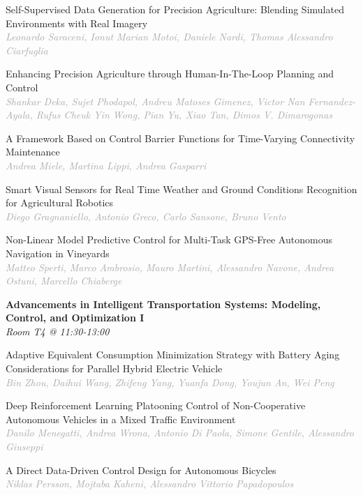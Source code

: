 \begin{multicols*}{2}
\small Self-Supervised Data Generation for Precision Agriculture: Blending Simulated Environments with Real Imagery\\ 
\footnotesize \textcolor{darkgray}{\textit{Leonardo Saraceni, Ionut Marian  Motoi, Daniele  Nardi, Thomas Alessandro  Ciarfuglia}}

\small Enhancing Precision Agriculture through Human-In-The-Loop Planning and Control\\ 
\footnotesize \textcolor{darkgray}{\textit{Shankar Deka, Sujet  Phodapol, Andreu  Matoses Gimenez, Victor  Nan Fernandez-Ayala, Rufus Cheuk Yin  Wong, Pian  Yu, Xiao  Tan, Dimos V.  Dimarogonas}}

\small A Framework Based on Control Barrier Functions for Time-Varying Connectivity Maintenance\\ 
\footnotesize \textcolor{darkgray}{\textit{Andrea Miele, Martina  Lippi, Andrea  Gasparri}}

\small Smart Visual Sensors for Real Time Weather and Ground Conditions Recognition for Agricultural Robotics\\ 
\footnotesize \textcolor{darkgray}{\textit{Diego Gragnaniello, Antonio  Greco, Carlo  Sansone, Bruno  Vento}}

\small Non-Linear Model Predictive Control for Multi-Task GPS-Free Autonomous Navigation in Vineyards\\ 
\footnotesize \textcolor{darkgray}{\textit{Matteo Sperti, Marco  Ambrosio, Mauro  Martini, Alessandro  Navone, Andrea  Ostuni, Marcello  Chiaberge}}

\normalsize \textbf{Advancements in Intelligent Transportation Systems: Modeling, Control, and Optimization I}\\
\small \textit{Room T4 @ 11:30-13:00}

\small Adaptive Equivalent Consumption Minimization Strategy with Battery Aging Considerations for Parallel Hybrid Electric Vehicle\\ 
\footnotesize \textcolor{darkgray}{\textit{Bin Zhou, Daihui  Wang, Zhifeng  Yang, Yuanfa  Dong, Youjun  An, Wei  Peng}}

\small Deep Reinforcement Learning Platooning Control of Non-Cooperative Autonomous Vehicles in a Mixed Traffic Environment\\ 
\footnotesize \textcolor{darkgray}{\textit{Danilo Menegatti, Andrea  Wrona, Antonio  Di Paola, Simone  Gentile, Alessandro  Giuseppi}}

\small A Direct Data-Driven Control Design for Autonomous Bicycles\\ 
\footnotesize \textcolor{darkgray}{\textit{Niklas Persson, Mojtaba  Kaheni, Alessandro Vittorio  Papadopoulos}}


\end{multicols*}
